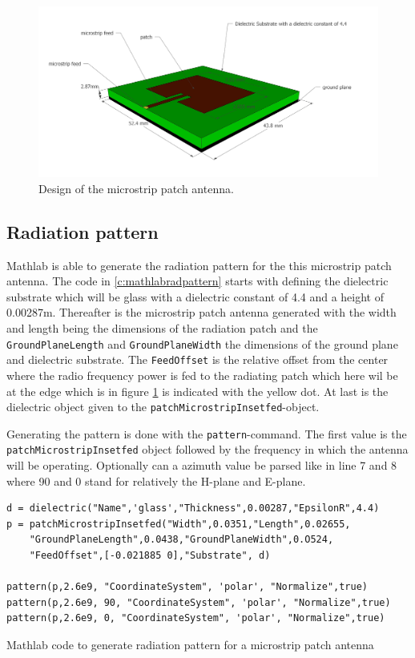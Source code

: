 \begin{figure}[h!]
  \includegraphics[width=\textwidth]{../images/MicrostripAntenna.jpg}
  \caption{Design of the microstrip patch antenna.}
  \label{fig:antennadesign}
\end{figure}

\subsection{Radiation pattern}
Mathlab is able to generate the radiation pattern for the this microstrip patch antenna.
The code in  \ref{c:mathlabradpattern} starts with defining the dielectric substrate which will be glass with a dielectric constant
of 4.4 and a height of 0.00287m. Thereafter is the microstrip patch antenna generated with the width and length being the dimensions
of the radiation patch and the \verb|GroundPlaneLength| and \verb|GroundPlaneWidth| the dimensions of the ground plane and dielectric substrate.
The \verb|FeedOffset| is the relative offset from the center where the radio frequency power is fed to the radiating patch which here wil be
at the edge which is in figure \ref{fig:antennadesign} is indicated with the yellow dot. At last is the dielectric object given to the 
\verb|patchMicrostripInsetfed|-object.

Generating the pattern is done with the \verb|pattern|-command. The first value is the \verb|patchMicrostripInsetfed| object followed by the frequency
in which the antenna will be operating. Optionally can a azimuth value be parsed like in line 7 and 8 where 90 and 0 stand for relatively the H-plane and E-plane.

\begin{listing}[h!]
\begin{verbatim}
d = dielectric("Name",'glass',"Thickness",0.00287,"EpsilonR",4.4)
p = patchMicrostripInsetfed("Width",0.0351,"Length",0.02655,
    "GroundPlaneLength",0.0438,"GroundPlaneWidth",0.O524,
    "FeedOffset",[-0.021885 0],"Substrate", d)

pattern(p,2.6e9, "CoordinateSystem", 'polar', "Normalize",true)
pattern(p,2.6e9, 90, "CoordinateSystem", 'polar', "Normalize",true)
pattern(p,2.6e9, 0, "CoordinateSystem", 'polar', "Normalize",true)
\end{verbatim}
\caption{Mathlab code to generate radiation pattern for a microstrip patch antenna}
\label{c:mathlabradpattern}
\end{listing}

